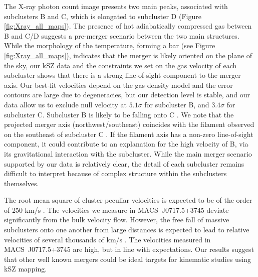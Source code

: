 \documentclass[twocolumn,traditabstract]{aa}
\begin{document}
The X-ray photon count image presents two main peaks, associated with subclusters B and C, which is elongated to subcluster D (Figure  \ref{fig:Xray_all_maps}). The presence of hot adiabatically compressed gas between B and C/D suggests a pre-merger scenario between the two main structures. While the morphology of the temperature, forming a bar (see Figure  \ref{fig:Xray_all_maps}), indicates that the merger is likely oriented on the plane of the sky, our kSZ data and the constraints we set on the gas velocity of each subcluster shows that there is a strong line-of-sight component to the merger axis. Our best-fit velocities depend on the gas density model and the error contours are large due to degeneracies, but our detection level is stable, and our data allow us to exclude null velocity at $5.1 \sigma$ for subcluster B, and $3.4 \sigma$ for subcluster C. Subcluster B is likely to be falling onto C \citep[the most massive of the subclusters, e.g.,][]{Limousin2015}. We note that the projected merger axis (northwest/southeast) coincides with the filament observed on the southeast of subcluster C \citep[e.g.,][]{Medezinski2013}. If the filament axis has a non-zero line-of-sight component, it could contribute to an explanation for the high velocity of B, via its gravitational interaction with the subcluster. While the main merger scenario supported by our data is relatively clear, the detail of each subcluster remains difficult to interpret because of complex structure within the subclusters themselves.

The root mean square of cluster peculiar velocities is expected to be of the order of 250 km/s \citep[e.g.,][]{Monteagudo2010}. The velocities we measure in \mbox{MACS~J0717.5+3745} deviate significantly from the bulk velocity flow. However, the free fall of massive subclusters onto one another from large distances is expected to lead to relative velocities of several thousands of km/s \citep{Sarazin2002}. The velocities measured in \mbox{MACS~J0717.5+3745} are high, but in line with expectations. Our results suggest that other well known mergers could be ideal targets for kinematic studies using kSZ mapping.
\end{document}
